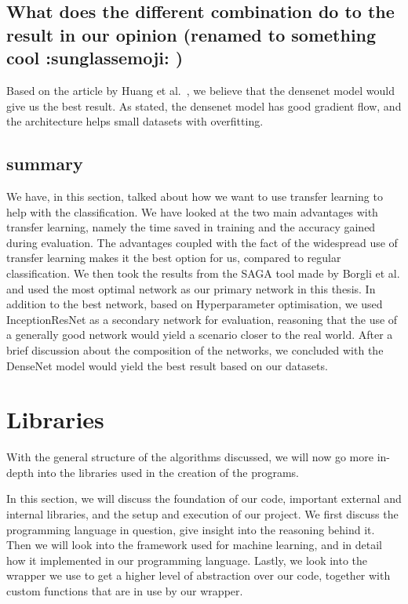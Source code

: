 \subsection{What does the different combination do to the result in our opinion (renamed to something cool :sunglassemoji: )}
Based on the article by Huang et al.~\cite{Huang_2017}, we believe that the densenet model would give us the best result. As stated, the densenet model has good gradient flow, and the architecture helps small datasets with overfitting. 

\subsection{summary}
We have, in this section, talked about how we want to use transfer learning to help with the classification. We have looked at the two main advantages with transfer learning, namely the time saved in training and the accuracy gained during evaluation. The advantages coupled with the fact of the widespread use of transfer learning makes it the best option for us, compared to regular classification.
 We then took the results from the SAGA tool made by Borgli et al. and used the most optimal network as our primary network in this thesis. 
In addition to the best network, based on Hyperparameter optimisation, we used InceptionResNet as a secondary network for evaluation, reasoning that the use of a generally good network would yield a scenario closer to the real world.
After a brief discussion about the composition of the networks, we concluded with the DenseNet model would yield the best result based on our datasets.





\section{Libraries} 
With the general structure of the algorithms discussed, we will now go more in-depth into the libraries used in the creation of the programs.

In this section, we will discuss the foundation of our code, important external and internal libraries, and the setup and execution of our project.  
We first discuss the programming language in question, give insight into the reasoning behind it. Then we will look into the framework used for machine learning, and in detail how it implemented in our programming language. Lastly, we look into the wrapper we use to get a higher level of abstraction over our code, together with custom functions that are in use by our wrapper. 

